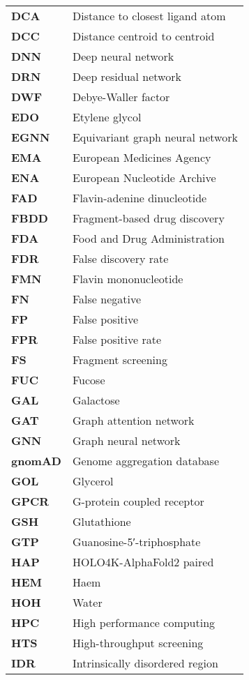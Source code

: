 \begin{longtable}[l]{@{}p{2.5cm}p{12cm}@{}}
\textbf{DCA} & Distance to closest ligand atom \\
\textbf{DCC} & Distance centroid to centroid \\
\textbf{DNN} & Deep neural network \\
\textbf{DRN} & Deep residual network \\
\textbf{DWF} & Debye-Waller factor \\
\textbf{EDO} & Etylene glycol \\
\textbf{EGNN} & Equivariant graph neural network \\
\textbf{EMA} & European Medicines Agency \\
\textbf{ENA} & European Nucleotide Archive \\
\textbf{FAD} & Flavin-adenine dinucleotide \\
\textbf{FBDD} & Fragment-based drug discovery \\
\textbf{FDA} & Food and Drug Administration \\
\textbf{FDR} & False discovery rate \\
\textbf{FMN} & Flavin mononucleotide \\
\textbf{FN} & False negative \\
\textbf{FP} & False positive \\
\textbf{FPR} & False positive rate \\
\textbf{FS} & Fragment screening \\
\textbf{FUC} & Fucose \\
\textbf{GAL} & Galactose \\
\textbf{GAT} & Graph attention network \\
\textbf{GNN} & Graph neural network \\
\textbf{gnomAD} & Genome aggregation database \\
\textbf{GOL} & Glycerol \\
\textbf{GPCR} & G-protein coupled receptor \\
\textbf{GSH} & Glutathione \\
\textbf{GTP} & Guanosine-5′-triphosphate \\
\textbf{HAP} & HOLO4K-AlphaFold2 paired \\
\textbf{HEM} & Haem \\
\textbf{HOH} & Water \\
\textbf{HPC} & High performance computing \\
\textbf{HTS} & High-throughput screening \\
\textbf{IDR} & Intrinsically disordered region \\

\end{longtable}
